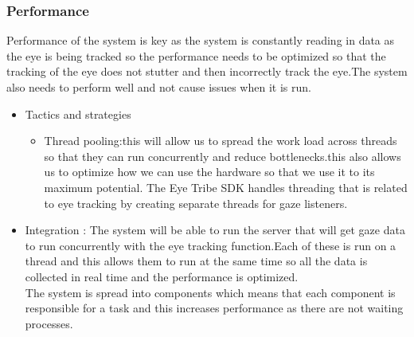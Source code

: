\subsubsection{Performance}
\begin{flushleft}
Performance of the system is key as the system is constantly reading in data as the eye is being tracked so the performance needs to be optimized so that the tracking of the eye does not stutter and then incorrectly track the eye.The system also needs to perform well and not cause issues when it is run.
\begin{itemize}
\item{Tactics and strategies}
\begin{itemize}
\item{Thread pooling}:this will allow us to spread the work load across threads so that they can run concurrently and reduce bottlenecks.this also allows us to optimize how we can use the hardware so that we use it to its maximum potential. The Eye Tribe SDK handles threading that is related to eye tracking by creating separate threads for gaze listeners.
\end{itemize}

\item{Integration} :
The system will be able to run the server that will get gaze data to run concurrently with the eye tracking function.Each of these is run on a thread and this allows them to run at the same time so all the data is collected in real time and the performance is optimized.\\
The system is spread into components which means that each component is responsible for a task and this increases performance as there are not waiting processes.
\end{itemize}

\end{flushleft}
		
